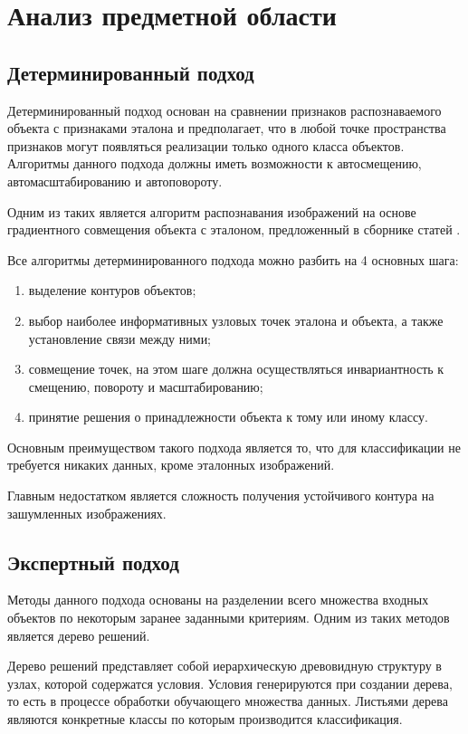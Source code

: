 \chapter{Анализ предметной области}

\section{Детерминированный подход}

Детерминированный подход основан на сравнении признаков распознаваемого объекта с признаками эталона и предполагает, что в любой точке пространства признаков могут появляться реализации только одного класса объектов. Алгоритмы данного подхода должны иметь возможности к автосмещению, автомасштабированию и автоповороту.

Одним из таких является алгоритм распознавания изображений на основе градиентного совмещения объекта с эталоном, предложенный в сборнике статей \cite{cyberlenin2}.

Все алгоритмы детерминированного подхода можно разбить на 4 основных шага:
\begin{enumerate}
	\item выделение контуров объектов;
	\item выбор наиболее информативных узловых точек эталона и объекта, а также установление связи между ними;
	\item совмещение точек, на этом шаге должна осуществляться инвариантность к смещению, повороту и масштабированию;
	\item принятие решения о принадлежности объекта к тому или иному классу.
\end{enumerate}

Основным преимуществом такого подхода является то, что для классификации не требуется никаких данных, кроме эталонных изображений.

Главным недостатком является сложность получения устойчивого контура на зашумленных изображениях.

\section{Экспертный подход}

Методы данного подхода основаны на разделении всего множества входных объектов по некоторым заранее заданными критериям. Одним из таких методов является дерево решений.

Дерево решений представляет собой иерархическую древовидную структуру в узлах, которой содержатся условия. Условия генерируются при создании дерева, то есть в процессе обработки обучающего множества данных. Листьями дерева являются конкретные классы по которым производится классификация.

